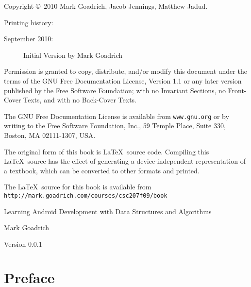 \documentclass[10pt]{book}
\newcommand{\thetitle}{Learning Android Development with Data Structures and Algorithms}
\newcommand{\theversion}{0.0.1}
\begin{document}
\begin{latexonly}
\pagebreak
\thispagestyle{empty}

{\small
Copyright \copyright ~2010 Mark Goadrich, Jacob Jennings, Matthew Jadud.

Printing history:

\begin{description}

\item[September 2010:] Initial Version by Mark Goadrich

\end{description}

\vspace{0.2in}

Permission is granted to copy, distribute, and/or modify this document
under the terms of the GNU Free Documentation License, Version 1.1 or
any later version published by the Free Software Foundation; with no
Invariant Sections, no Front-Cover Texts, and with no Back-Cover Texts.

The GNU Free Documentation License is available from {\tt www.gnu.org}
or by writing to the Free Software Foundation, Inc., 59 Temple Place,
Suite 330, Boston, MA 02111-1307, USA.

The original form of this book is \LaTeX\ source code.  Compiling this
\LaTeX\ source has the effect of generating a device-independent
representation of a textbook, which can be converted to other formats
and printed.

The \LaTeX\ source for this book is available from
{\tt http://mark.goadrich.com/courses/csc207f09/book}

\vspace{0.2in}

} %

\end{latexonly}



\begin{htmlonly}


{\Huge \thetitle}

{\Large Mark Goadrich}

Version \theversion

\setcounter{chapter}{-1}

\end{htmlonly}

\chapter{Preface}
\end{document}
